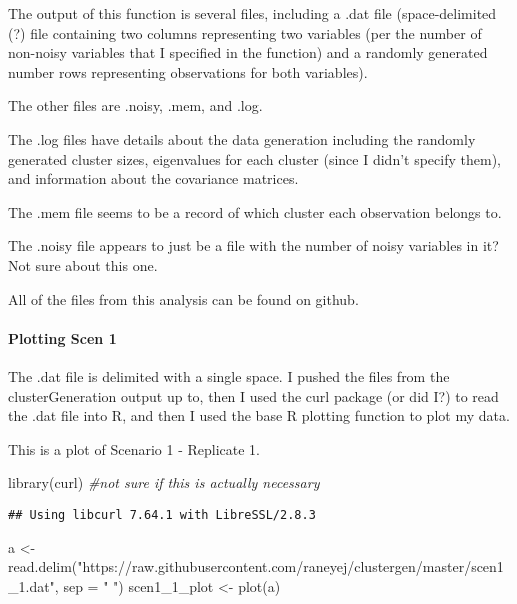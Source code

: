 \documentclass[
]{article}
\newenvironment{Shaded}{\begin{snugshade}}{\end{snugshade}}
\newcommand{\AttributeTok}[1]{\textcolor[rgb]{0.77,0.63,0.00}{#1}}
\newcommand{\CommentTok}[1]{\textcolor[rgb]{0.56,0.35,0.01}{\textit{#1}}}
\newcommand{\FunctionTok}[1]{\textcolor[rgb]{0.00,0.00,0.00}{#1}}
\newcommand{\NormalTok}[1]{#1}
\newcommand{\OtherTok}[1]{\textcolor[rgb]{0.56,0.35,0.01}{#1}}
\newcommand{\StringTok}[1]{\textcolor[rgb]{0.31,0.60,0.02}{#1}}
\begin{document}
The output of this function is several files, including a .dat file
(space-delimited (?) file containing two columns representing two
variables (per the number of non-noisy variables that I specified in the
function) and a randomly generated number rows representing observations
for both variables).

The other files are .noisy, .mem, and .log.

The .log files have details about the data generation including the
randomly generated cluster sizes, eigenvalues for each cluster (since I
didn't specify them), and information about the covariance matrices.

The .mem file seems to be a record of which cluster each observation
belongs to.

The .noisy file appears to just be a file with the number of noisy
variables in it? Not sure about this one.

All of the files from this analysis can be found on github.

\hypertarget{plotting-scen-1}{%
\paragraph{Plotting Scen 1}\label{plotting-scen-1}}

The .dat file is delimited with a single space. I pushed the files from
the clusterGeneration output up to, then I used the curl package (or did
I?) to read the .dat file into R, and then I used the base R plotting
function to plot my data.

This is a plot of Scenario 1 - Replicate 1.

\begin{Shaded}
\begin{Highlighting}[]
\FunctionTok{library}\NormalTok{(curl) }\CommentTok{\#not sure if this is actually necessary}
\end{Highlighting}
\end{Shaded}

\begin{verbatim}
## Using libcurl 7.64.1 with LibreSSL/2.8.3
\end{verbatim}

\begin{Shaded}
\begin{Highlighting}[]
\NormalTok{a }\OtherTok{\textless{}{-}} \FunctionTok{read.delim}\NormalTok{(}\StringTok{"https://raw.githubusercontent.com/raneyej/clustergen/master/scen1\_1.dat"}\NormalTok{, }\AttributeTok{sep =} \StringTok{" "}\NormalTok{)}
\NormalTok{scen1\_1\_plot }\OtherTok{\textless{}{-}} \FunctionTok{plot}\NormalTok{(a)}
\end{Highlighting}
\end{Shaded}
\end{document}
